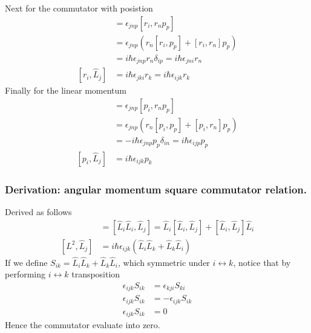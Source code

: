 \documentclass[../../../main.tex]{subfiles}
\begin{document}
Next for the commutator with posistion
\begin{align*}
    [r_i,\hat{L}_j]
     & =  \epsilon_{jnp}[r_i,r_np_p]                                       \\
     & = \epsilon_{jnp} \left( r_n[r_i,p_p ]+[r_i,r_n ]p_p \right)         \\
     & =  i \hbar \epsilon_{jnp }r_n \delta_{ip}=i \hbar \epsilon_{jni}r_n \\
    [r_i,\hat{L}_j]
     & = i \hbar \epsilon_{jki}r_k = i \hbar \epsilon_{ijk}r_k
\end{align*}
Finally for the linear momentum
\begin{align*}
    [p_i,\hat{L}_j]
     & =  \epsilon_{jnp}[p_i,r_np_p]                                           \\
     & = \epsilon_{jnp} \left( r_n[p_i,p_p ]+[p_i,r_n ]p_p \right)             \\
     & =  -i \hbar \epsilon_{jnp }p_p \delta_{in} = i \hbar  \epsilon_{ijp}p_p \\
    [p_i,\hat{L}_j]
     & = i \hbar \epsilon_{ijk}p_k
\end{align*}

\subsubsection*{Derivation: angular momentum square commutator relation.}
Derived as follows
\begin{align*}
    [L^2, \hat{L}_j]
     & = [\hat{L}_i \hat{L}_i, \hat{L}_j] =  \hat{L}_i[\hat{L}_i, \hat{L}_j] + [\hat{L}_i, \hat{L}_j]\hat{L}_i \\
    [L^2, \hat{L}_j]
     & = i \hbar \epsilon_{ijk} (\hat{L}_i \hat{L}_k + \hat{L}_k \hat{L}_i)
\end{align*}
If we define $S_{ik}=\hat{L}_i \hat{L}_k + \hat{L}_k \hat{L}_i$, which symmetric under $i \leftrightarrow k$, notice that by performing $i \leftrightarrow k$ transposition
\begin{align*}
    \epsilon_{ijk}S_{ik} & = \epsilon_{kji}S_{ki}  \\
    \epsilon_{ijk}S_{ik} & = -\epsilon_{ijk}S_{ik} \\
    \epsilon_{ijk}S_{ik} & = 0
\end{align*}
Hence the commutator evaluate into zero.
\end{document}
